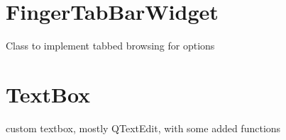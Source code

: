 \documentclass[letterpaper,10pt,english]{sphinxmanual}
\begin{document}
\section{FingerTabBarWidget}
\label{FingerTabBarWidget:fingertabbarwidget}\label{FingerTabBarWidget::doc}

\begin{fulllineitems}
\label{FingerTabBarWidget:Auxwidgets.FingerTabBarWidget}
Class to implement tabbed browsing for options

\begin{fulllineitems}
\label{FingerTabBarWidget:Auxwidgets.FingerTabBarWidget.paintEvent}
\end{fulllineitems}


\begin{fulllineitems}
\label{FingerTabBarWidget:Auxwidgets.FingerTabBarWidget.tabSizeHint}
\end{fulllineitems}


\end{fulllineitems}



\section{TextBox}
\label{TextBox:textbox}\label{TextBox::doc}

\begin{fulllineitems}
\label{TextBox:Auxwidgets.TextBox}
custom textbox, mostly QTextEdit, with some added functions

\begin{fulllineitems}
\label{TextBox:Auxwidgets.TextBox.output}
\end{fulllineitems}


\end{fulllineitems}
\end{document}
